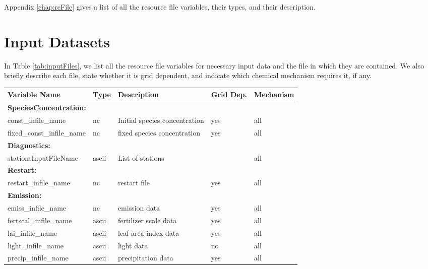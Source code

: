 \noindent
Appendix \ref{chap:rcFile} gives a list of all the resource file variables,
their types, and their description.
%
%
%
\section{Input Datasets}

\noindent
In Table \ref{tab:inputFiles}, we list all the resource file variables for necessary input
data and the file in which they are contained. 
We also briefly describe each file, state whether it is grid dependent, and indicate
 which chemical mechanism requires it, if any.

{\small

\begin{landscape}

\begin{center}
\begin{longtable}{|l|l|l|l|l|} \hline\hline
{\bf Variable Name} & {\bf Type} & {\bf Description} & {\bf Grid Dep.} & {\bf Mechanism} \\ \hline\hline
\multicolumn{5}{|l|}{\bf SpeciesConcentration:} \\ \hline
const\_infile\_name           & nc    & Initial species concentration & yes   & all \\ \hline
fixed\_const\_infile\_name    & nc    & fixed species concentration & yes & all \\ \hline
\multicolumn{5}{|l|}{\bf Diagnostics:} \\ \hline
stationsInputFileName         & ascii    & List of stations &  & all \\ \hline
\multicolumn{5}{|l|}{\bf Restart:} \\ \hline
restart\_infile\_name         & nc    & restart file                & yes & all \\ \hline
\multicolumn{5}{|l|}{\bf Emission:} \\ \hline
emiss\_infile\_name           & nc    & emission data                & yes & all \\ \hline
fertscal\_infile\_name        & ascii & fertilizer scale data & yes & all \\ \hline
lai\_infile\_name             & ascii & leaf area index data  & yes & all \\ \hline
light\_infile\_name           & ascii & light data            &  no & all \\ \hline 
precip\_infile\_name          & ascii & precipitation data    & yes & all \\ \hline

\end{longtable}
\end{center}
\end{landscape}}
